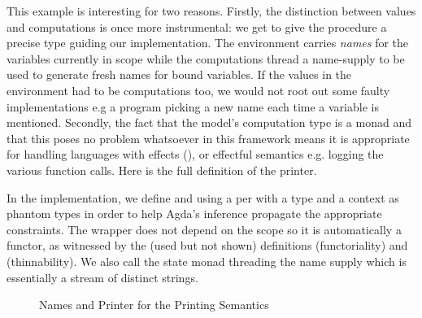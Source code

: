 This example is interesting for two reasons. Firstly, the distinction between
values and computations is once more instrumental: we get to give the procedure
a precise type guiding our implementation. The environment carries \emph{names}
for the variables currently in scope while the computations thread a name-supply
to be used to generate fresh names for bound variables. If the values in the
environment had to be computations too, we would not root out some faulty
implementations e.g a program picking a new name each time a variable is mentioned.
%
Secondly, the fact that the model's computation type is a monad and that this
poses no problem whatsoever in this framework means it is appropriate for
handling languages with effects (\cite{moggi1991notions}), or effectful
semantics e.g. logging the various function calls. Here is the full definition
of the printer.

In the implementation, we define  and  using a per
with a type and a context as phantom types in order to help Agda's inference
propagate the appropriate constraints. The wrapper  does not depend on
the scope  so it is automatically a  functor, as witnessed by
the (used but not shown) definitions  (functoriality)
and  (thinnability).
%
We also call  the state monad threading the name supply which is
essentially a stream of distinct strings.

\begin{figure}[h]
\begin{minipage}[t]{0.6\textwidth}
\end{minipage}
\begin{minipage}[t]{0.4\textwidth}
\end{minipage}

\begin{minipage}[t]{0.5\textwidth}
\end{minipage}
\begin{minipage}[t]{0.5\textwidth}
\end{minipage}
\caption{Names and Printer for the Printing Semantics\label{fig:semprint}}
\end{figure}

